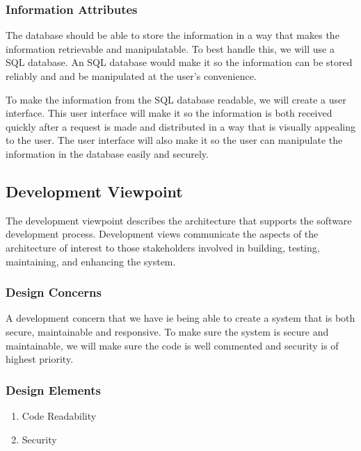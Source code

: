 \documentclass[letterpaper,10pt,titlepage,journal,compsoc,draftclsnofoot,onecolumn]{IEEEtran}
\begin{document}
\subsubsection{Information Attributes}

The database should be able to store the information in a way that makes the information retrievable and manipulatable. To best handle this, we will use a SQL database. An SQL database would make it so the information can be stored reliably and and be manipulated at the user's convenience. 

To make the information from the SQL database readable, we will create a user interface. This user interface will make it so the information is both received quickly after a request is made and distributed in a way that is visually appealing to the user. The user interface will also make it so the user can manipulate the information in the database easily and securely. 

\subsection{Development Viewpoint}

The development viewpoint describes the architecture that supports the software development process. Development views communicate the aspects of the architecture of interest to those stakeholders involved in building, testing, maintaining, and enhancing the system.

\subsubsection{Design Concerns}

A development concern that we have ie being able to create a system that is both secure, maintainable and responsive. To make sure the system is secure and maintainable, we will make sure the code is well commented and security is of highest priority. 

\subsubsection{Design Elements}

\begin{enumerate}

\item{Code Readability}
\item{Security}
\end{enumerate}
\end{document}
